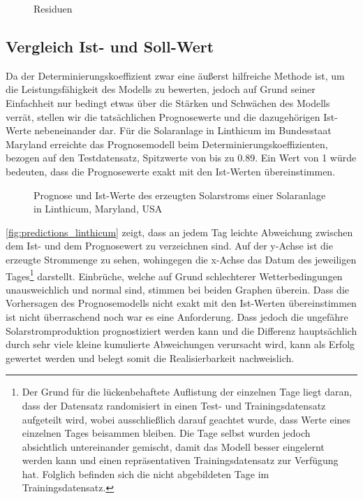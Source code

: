 \documentclass[12pt, a4paper]{article}
\begin{document}

\begin{figure}
\centering
\def\svgwidth{400pt}

\caption{Residuen }
\label{fig:residuals}
\end {figure}

\subsection{Vergleich Ist- und Soll-Wert}

Da der Determinierungskoeffizient zwar eine äußerst hilfreiche Methode ist, um die Leistungsfähigkeit des Modells zu bewerten, jedoch auf Grund seiner Einfachheit nur bedingt etwas über die Stärken und Schwächen des Modells verrät, stellen wir die tatsächlichen Prognosewerte und die dazugehörigen Ist-Werte nebeneinander dar. Für die Solaranlage in Linthicum im Bundesstaat Maryland erreichte das Prognosemodell beim Determinierungskoeffizienten, bezogen auf den Testdatensatz, Spitzwerte von bis zu 0.89. Ein Wert von 1 würde bedeuten, dass die Prognosewerte exakt mit den Ist-Werten übereinstimmen. 

\begin{figure}[H]
\centering
\def\svgwidth{400pt}

\caption{Prognose und Ist-Werte des erzeugten Solarstroms einer Solaranlage in Linthicum, Maryland, USA}
\label{fig:predictions_linthicum}
\end {figure}

\autoref{fig:predictions_linthicum} zeigt, dass an jedem Tag leichte Abweichung zwischen dem Ist- und dem Prognosewert zu verzeichnen sind. Auf der y-Achse ist die erzeugte Strommenge zu sehen, wohingegen die x-Achse das Datum des jeweiligen Tages\footnote{Der Grund für die lückenbehaftete Auflistung der einzelnen Tage liegt daran, dass der Datensatz randomisiert in einen Test- und Trainingsdatensatz aufgeteilt wird, wobei ausschließlich darauf geachtet wurde, dass Werte eines einzelnen Tages beisammen bleiben. Die Tage selbst wurden jedoch absichtlich untereinander gemischt, damit das Modell besser eingelernt werden kann und einen repräsentativen Trainingsdatensatz zur Verfügung hat. Folglich befinden sich die nicht abgebildeten Tage im Trainingsdatensatz.} darstellt. Einbrüche, welche auf Grund schlechterer Wetterbedingungen unausweichlich und normal sind, stimmen bei beiden Graphen überein. Dass die Vorhersagen des Prognosemodells nicht exakt mit den Ist-Werten übereinstimmen ist nicht überraschend noch war es eine Anforderung. Dass jedoch die ungefähre Solarstromproduktion prognostiziert werden kann und die Differenz hauptsächlich durch sehr viele kleine kumulierte Abweichungen verursacht wird, kann als Erfolg gewertet werden und belegt somit die Realisierbarkeit nachweislich.
\end{document}

